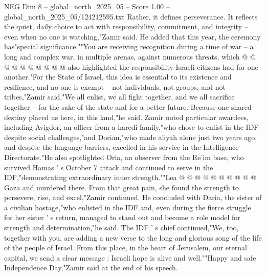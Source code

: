 \begin{textsample}{NEG Dim 8 – global\_north\_2025\_05 – Score 1.00 – global\_north\_2025\_05/124212595.txt}
Rather, it defines perseverance.
It reflects the quiet, daily choice to act with responsibility, commitment, and integrity -- even when no one is watching,"Zamir said.
He added that this year, the ceremony has"special significance.""You are receiving recognition during a time of war -- a long and complex war, in multiple arenas, against numerous threats, which @ @ @ @ @ @ @ @ @ @ also highlighted the responsibility Israeli citizens had for one another."For the State of Israel, this idea is essential to its existence and resilience, and no one is exempt -- not individuals, not groups, and not tribes,"Zamir said."We all enlist, we all fight together, and we all sacrifice together -- for the sake of the state and for a better future.
Because one shared destiny placed us here, in this land,"he said.
Zamir noted particular awardees, including Avigdor, an officer from a haredi family,"who chose to enlist in the IDF despite social challenges,"and Dorian,"who made aliyah alone just two years ago, and despite the language barriers, excelled in his service in the Intelligence Directorate."He also spotlighted Oria, an observer from the Re'im base, who survived Hamas ' s October 7 attack and continued to serve in the IDF,"demonstrating extraordinary inner strength.""Lea @ @ @ @ @ @ @ @ @ @ Gaza and murdered there.
From that great pain, she found the strength to persevere, rise, and excel,"Zamir continued.
He concluded with Daria, the sister of a civilian hostage,"who enlisted in the IDF and, even during the fierce struggle for her sister ' s return, managed to stand out and become a role model for strength and determination,"he said.
The IDF ' s chief continued,"We, too, together with you, are adding a new verse to the long and glorious song of the life of the people of Israel.
From this place, in the heart of Jerusalem, our eternal capital, we send a clear message : Israeli hope is alive and well.""Happy and safe Independence Day,"Zamir said at the end of his speech.

\end{textsample}

